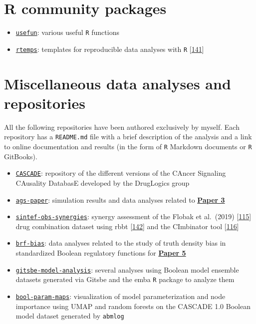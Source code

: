 \documentclass[
  12pt,
]{book}
\providecommand{\tightlist}{%
  \setlength{\itemsep}{0pt}\setlength{\parskip}{0pt}}
\begin{document}
\hypertarget{r-community-packages}{%
\section*{R community packages}\label{r-community-packages}}

\begin{itemize}
\tightlist
\item
  \href{https://github.com/bblodfon/usefun}{\texttt{usefun}}: various useful \texttt{R} functions
\item
  \href{https://github.com/bblodfon/rtemps}{\texttt{rtemps}}: templates for reproducible data analyses with \texttt{R} {[}\protect\hyperlink{ref-rtemps}{141}{]}
\end{itemize}

\hypertarget{misc-links}{%
\section*{Miscellaneous data analyses and repositories}\label{misc-links}}

All the following repositories have been authored exclusively by myself.
Each repository has a \texttt{README.md} file with a brief description of the analysis and a link to online documentation and results (in the form of \texttt{R} Markdown documents or \texttt{R} GitBooks).

\begin{itemize}
\tightlist
\item
  \href{https://github.com/druglogics/cascade}{\texttt{CASCADE}}: repository of the different versions of the CAncer Signaling CAusality DatabasE developed by the DrugLogics group
\item
  \href{https://github.com/druglogics/ags-paper}{\texttt{ags-paper}}: simulation results and data analyses related to \textbf{\protect\hyperlink{Paper3}{Paper 3}}
\item
  \href{https://github.com/druglogics/sintef-obs-synergies}{\texttt{sintef-obs-synergies}}: synergy assessment of the Flobak et al.~(2019) {[}\protect\hyperlink{ref-Flobak2019}{115}{]} drug combination dataset using rbbt {[}\protect\hyperlink{ref-Vazquez2010}{142}{]} and the CImbinator tool {[}\protect\hyperlink{ref-Flobak2017}{116}{]}
\item
  \href{https://github.com/druglogics/brf-bias}{\texttt{brf-bias}}: data analyses related to the study of truth density bias in standardized Boolean regulatory functions for \textbf{\protect\hyperlink{Paper5}{Paper 5}}
\item
  \href{https://github.com/druglogics/gitsbe-model-analysis}{\texttt{gitsbe-model-analysis}}: several analyses using Boolean model ensemble datasets generated via Gitsbe and the emba \texttt{R} package to analyze them
\item
  \href{https://github.com/druglogics/bool-param-maps}{\texttt{bool-param-maps}}: visualization of model parameterization and node importance using UMAP and random forests on the CASCADE 1.0 Boolean model dataset generated by \texttt{abmlog}
\end{itemize}
\end{document}
